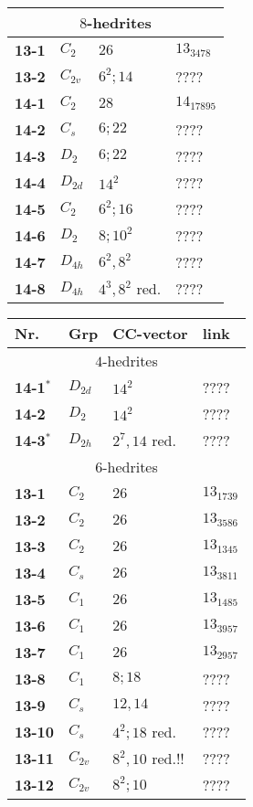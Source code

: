 \documentclass[12pt]{article}
\begin{document}
\begin{table}
\begin{center}
{\begin{minipage}{7cm}
\begin{tabular}{||l|l|l|l||}
\hline
\multicolumn{4}{||c||}{$8$-hedrites}\\\hline
{\bf 13-1}	&$C_2$	&$26$		&$13_{3478}$\\
{\bf 13-2}	&$C_{2v}$	&$6^2; 14$	&????\\\hline
{\bf 14-1}	&$C_2$	&$28$		&$14_{17895}$\\
{\bf 14-2}	&$C_s$	&$6; 22$		&????\\
{\bf 14-3}	&$D_2$	&$6; 22$		&????\\
{\bf 14-4}	&$D_{2d}$	&$14^2$		&????\\
{\bf 14-5}	&$C_2$	&$6^2; 16$	&????\\
{\bf 14-6}	&$D_2$	&$8; 10^2$	&????\\
{\bf 14-7}	&$D_{4h}$	&$6^2, 8^2$	&????\\
{\bf 14-8}	&$D_{4h}$	&$4^3, 8^2$ red.	&????\\\hline
\end{tabular}
\end{minipage}
\begin{minipage}[t]{7cm}
\begin{tabular}{||l|l|l|l||}
\hline
Nr.	&Grp 	&CC-vector	&link\\\hline
\multicolumn{4}{||c||}{$4$-hedrites}\\\hline
{\bf 14-1${}^*$}&$D_{2d}$	&$14^2$		&????\\\hline
{\bf 14-2}	&$D_2$	&$14^2$		&????\\	
{\bf 14-3${}^*$}&$D_{2h}$       &$2^7, 14$ red.  &????\\
\hline
\multicolumn{4}{||c||}{$6$-hedrites}\\\hline
{\bf 13-1}	&$C_2$	&$26$		&$13_{1739}$\\
{\bf 13-2} 	&$C_2$	&$26$		&$13_{3586}$\\
{\bf 13-3} 	&$C_2$	&$26$		&$13_{1345}$\\
{\bf 13-4} 	&$C_s$	&$26$		&$13_{3811}$\\
{\bf 13-5} 	&$C_1$	&$26$		&$13_{1485}$\\
{\bf 13-6}	&$C_1$	&$26$		&$13_{3957}$\\
{\bf 13-7}	&$C_1$	&$26$		&$13_{2957}$\\
{\bf 13-8}	&$C_1$	&$8; 18$		&????\\
{\bf 13-9}	&$C_s$	&$12, 14$		&????\\
{\bf 13-10}	&$C_s$	&$4^2; 18$ red.	&????\\
{\bf 13-11}	&$C_{2v}$	&$8^2, 10$ red.!!	&????\\
{\bf 13-12}	&$C_{2v}$	&$8^2; 10$	&????\\

\end{tabular}
\end{minipage}}
\end{center}
\end{table}
\end{document}
